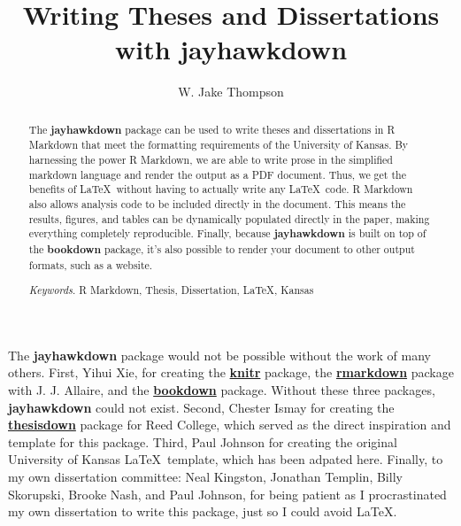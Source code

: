\documentclass[12pt,english]{kuthesis}
\title{Writing Theses and Dissertations with jayhawkdown}
\author{W. Jake Thompson}
\begin{document}
\begin{romanpages}

\maketitle
  \begin{abstract}
    The \textbf{jayhawkdown} package can be used to write theses and dissertations in R Markdown that meet the formatting requirements of the University of Kansas. By harnessing the power R Markdown, we are able to write prose in the simplified markdown language and render the output as a PDF document. Thus, we get the benefits of \LaTeX~without having to actually write any \LaTeX~code. R Markdown also allows analysis code to be included directly in the document. This means the results, figures, and tables can be dynamically populated directly in the paper, making everything completely reproducible. Finally, because \textbf{jayhawkdown} is built on top of the \textbf{bookdown} package, it's also possible to render your document to other output formats, such as a website.
    
    \emph{Keywords}. R Markdown, Thesis, Dissertation, LaTeX, Kansas
  \end{abstract}

  \begin{acknowledgementslong}
    The \textbf{jayhawkdown} package would not be possible without the work of many others. First, Yihui Xie, for creating the \href{https://yihui.org/knitr/}{\textbf{knitr}} package, the \href{https://github.com/rstudio/rmarkdown}{\textbf{rmarkdown}} package with J. J. Allaire, and the \href{https://github.com/rstudio/bookdown}{\textbf{bookdown}} package. Without these three packages, \textbf{jayhawkdown} could not exist. Second, Chester Ismay for creating the \href{https://github.com/ismayc/thesisdown}{\textbf{thesisdown}} package for Reed College, which served as the direct inspiration and template for this package. Third, Paul Johnson for creating the original University of Kansas \LaTeX~template, which has been adpated here. Finally, to my own dissertation committee: Neal Kingston, Jonathan Templin, Billy Skorupski, Brooke Nash, and Paul Johnson, for being patient as I procrastinated my own dissertation to write this package, just so I could avoid \LaTeX.
  \end{acknowledgementslong}
\tableofcontents{}

\listoffigures

\listoftables

\end{romanpages}
\end{document}
